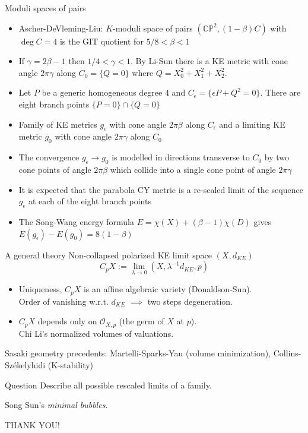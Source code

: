 \documentclass{beamer}
\newcommand{\CP}{\mathbb{CP}}
\begin{document}
\begin{frame}{Moduli spaces of pairs}
	\begin{itemize}
		\item Ascher-DeVleming-Liu: \(K\)-moduli space of pairs \((\CP^2, (1-\beta)C)\) with \(\deg C = 4\) is the GIT quotient for \(5/8 < \beta < 1\)
		\pause
		\item If \(\gamma = 2\beta -1\) then \(1/4 < \gamma < 1\). By Li-Sun there is a KE metric with cone angle \(2\pi\gamma\) along \(C_0 = \{Q=0\}\) where \(Q=X_0^2+X_1^2+X_2^2\).
		\pause
		\item Let \(P\) be a generic homogeneous degree \(4\) and \(C_{\epsilon} = \{\epsilon P + Q^2=0\}\). There are eight branch points \(\{P=0\} \cap \{Q=0\}\)
		\pause
		\item Family of KE metrics $g_{\epsilon}$ with cone angle $2\pi\beta$  along $C_{\epsilon}$ and a limiting KE metric $g_0$ with cone angle $2\pi\gamma$ along $C_0$
		\pause
		\item The convergence \(g_{\epsilon} \to g_0\) is modelled 
		in directions transverse to \(C_0\) by two cone points of angle \(2\pi\beta\) which collide into a single cone point of angle \(2\pi\gamma\)
		\pause
		 \item It is expected that the parabola CY metric is a re-scaled limit of the sequence \(g_{\epsilon}\) at each of the eight branch points
		 \pause
		 \item The Song-Wang energy formula \(E=\chi(X) + (\beta-1)\chi(D)\) gives \(E(g_{\epsilon}) - E(g_0) = 8 (1-\beta)\) 
	\end{itemize}
		
\end{frame}



\begin{frame}{A general theory}
	Non-collapsed polarized KE limit space \((X, d_{KE})\)
	\[C_p X := \lim_{\lambda \to 0} (X, \lambda^{-1}d_{KE},p)\]
	\begin{itemize}
		\pause
		\item Uniqueness, \(C_pX\) is an affine algebraic variety (Donaldson-Sun).\\
		Order of vanishing w.r.t. \(d_{KE}\) \(\implies\) two steps degeneration.
		\pause
		\item \(C_pX\) depends only on \(\mathcal{O}_{X,p}\) (the germ of \(X\) at \(p\)). \\
		Chi Li's normalized volumes of valuations.
	\end{itemize}
	\pause
	Sasaki geometry precedents: Martelli-Sparks-Yau (volume minimization),
	Collins-Sz\'ekelyhidi (K-stability) 
	\pause
	\begin{block}{Question}
		Describe all possible rescaled limits of a family.
	\end{block}
	\pause
	Song Sun's \emph{minimal bubbles}.
	
\end{frame}

\begin{frame}{}
	\centering
	\Huge{THANK YOU!}
\end{frame}
\end{document}
